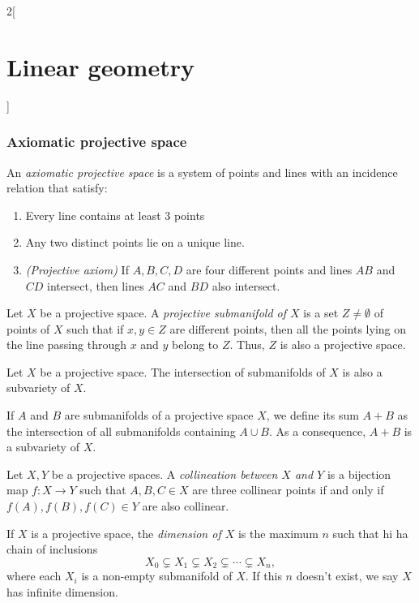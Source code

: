 \documentclass[class=article,10pt,crop=false]{standalone}
\begin{document}
\begin{multicols}{2}[\section{Linear geometry}]
\subsubsection{Axiomatic projective space}
\begin{definition}
An \textit{axiomatic projective space} is a system of points and lines with an incidence relation that satisfy:
\begin{enumerate}
    \item Every line contains at least 3 points
    \item Any two distinct points lie on a unique line.
    \item \textit{(Projective axiom)} If $A,B,C,D$ are four different points and lines $AB$ and $CD$ intersect, then lines $AC$ and $BD$ also intersect.
\end{enumerate}
\end{definition}
\begin{definition}
Let $X$ be a projective space. A \textit{projective submanifold of $X$} is a set $Z\ne\emptyset$ of points of $X$ such that if $x,y\in Z$ are different points, then all the points lying on the line passing through $x$ and $y$ belong to $Z$. Thus, $Z$ is also a projective space.
\end{definition}
\begin{prop}
Let $X$ be a projective space. The intersection of submanifolds of $X$ is also a subvariety of $X$.
\end{prop}
\begin{prop}
If $A$ and $B$ are submanifolds of a projective space $X$, we define its sum $A+B$ as the intersection of all submanifolds containing $A\cup B$. As a consequence, $A+B$ is a subvariety of $X$.
\end{prop}
\begin{definition}
Let $X,Y$ be a projective spaces. A \textit{collineation between $X$ and $Y$} is a bijection map $f:X\rightarrow Y$ such that $A,B,C\in X$ are three collinear points if and only if $f(A),f(B),f(C)\in Y$ are also collinear.
\end{definition}
\begin{definition}
If $X$ is a projective space, the \textit{dimension of $X$} is the maximum $n$ such that hi ha chain of inclusions $$X_0\varsubsetneq X_1\varsubsetneq X_2 \varsubsetneq\cdots\varsubsetneq X_n,$$ where each $X_i$ is a non-empty submanifold of $X$. If this $n$ doesn't exist, we say $X$ has infinite dimension.
\end{definition}
\begin{definition}

\end{definition}
\end{multicols}
\end{document}
